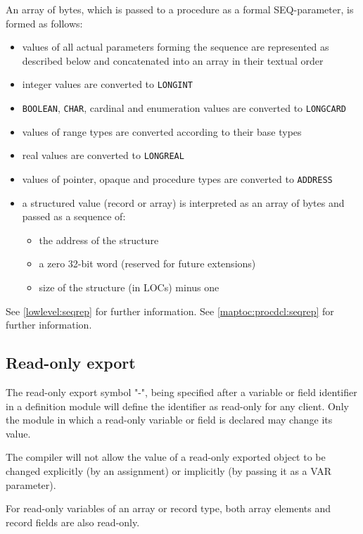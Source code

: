 An array of bytes, which is passed to a procedure as a formal
SEQ-parameter, is formed as follows:
\begin{itemize}
\item
  values of all actual parameters forming the sequence are represented
  as described below and concatenated into an array in their textual order
\item integer values are converted to {\tt LONGINT}
\item {\tt BOOLEAN}, {\tt CHAR}, cardinal and enumeration values are converted
      to {\tt LONGCARD}
\item values of range types are converted according to their
      base types
\item real values are converted to {\tt LONGREAL}
\item values of pointer, opaque and procedure types
are converted to {\tt ADDRESS}
\item
    a structured value (record or array) is interpreted
    as an array of bytes and passed as a sequence
    of:
    \begin{itemize}
    \item the address of the structure
    \item a zero 32-bit word (reserved for future extensions)
    \item size of the structure (in LOCs) minus one
    \end{itemize}
\end{itemize}

\ifgencode
  See \ref{lowlevel:seqrep} for further information.
\fi
\ifgenc
  See \ref{maptoc:procdcl:seqrep} for further information.
\fi

\subsection{Read-only export}\label{RO:export}

\mextonly

The \ot{} read-only export symbol "-", being specified after a variable or field
identifier in a definition module will define the identifier as read-only
for any client.
Only the module in which a read-only variable or field is declared may
change its value.

The compiler will not allow the value
of a read-only exported object to be changed explicitly (by
an assignment) or implicitly (by passing it as a VAR parameter).

For read-only variables of an array or record type, both array elements
and record fields are also read-only.

